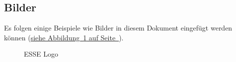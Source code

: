 \documentclass[12pt,a4paper,titlepage,oneside]{scrartcl}
\begin{document}
\subsection{Bilder}

Es folgen einige Beispiele wie Bilder in diesem Dokument eingefügt werden können
(\hyperref[fig:logo1]{siehe Abbildung~\ref*{fig:logo1} auf Seite~\pageref*{fig:logo1}}).

\begin{figure}[h!]
  \centering
  \caption{ESSE Logo}
  \label{fig:logo1}
\end{figure}


%
%
\end{document}
